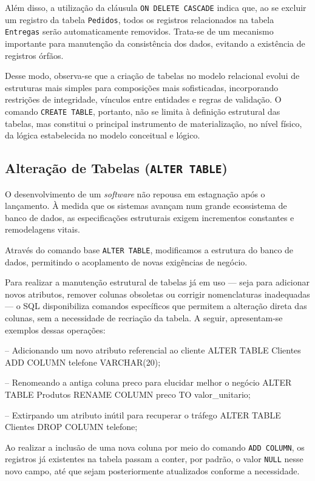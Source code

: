 Além disso, a utilização da cláusula \texttt{ON DELETE CASCADE} indica que, ao se excluir um registro da tabela \texttt{Pedidos}, todos os registros relacionados na tabela \texttt{Entregas} serão automaticamente removidos. Trata-se de um mecanismo importante para manutenção da consistência dos dados, evitando a existência de registros órfãos.

Desse modo, observa-se que a criação de tabelas no modelo relacional evolui de estruturas mais simples para composições mais sofisticadas, incorporando restrições de integridade, vínculos entre entidades e regras de validação. O comando \texttt{CREATE TABLE}, portanto, não se limita à definição estrutural das tabelas, mas constitui o principal instrumento de materialização, no nível físico, da lógica estabelecida no modelo conceitual e lógico.

\subsection{Alteração de Tabelas (\texttt{ALTER TABLE})}

O desenvolvimento de um \textit{software} não repousa em estagnação após o lançamento. À medida que os sistemas avançam num grande ecossistema de banco de dados, as especificações estruturais exigem incrementos constantes e remodelagens vitais.

Através do comando base \texttt{ALTER TABLE}, modificamos a estrutura do banco de dados, permitindo o acoplamento de novas exigências de negócio.

Para realizar a manutenção estrutural de tabelas já em uso — seja para adicionar novos atributos, remover colunas obsoletas ou corrigir nomenclaturas inadequadas — o SQL disponibiliza comandos específicos que permitem a alteração direta das colunas, sem a necessidade de recriação da tabela. A seguir, apresentam-se exemplos dessas operações:

\begin{sqlcode}
-- Adicionando um novo atributo referencial ao cliente
ALTER TABLE Clientes
ADD COLUMN telefone VARCHAR(20);

-- Renomeando a antiga coluna preco para elucidar melhor o negócio
ALTER TABLE Produtos 
RENAME COLUMN preco TO valor_unitario;

-- Extirpando um atributo inútil para recuperar o tráfego
ALTER TABLE Clientes
DROP COLUMN telefone;
\end{sqlcode}

\begin{tcolorbox}[colback=blue!5,colframe=blue!40!black,title=Nota importante: Novos dados NULOS]
Ao realizar a inclusão de uma nova coluna por meio do comando \texttt{ADD COLUMN}, os registros já existentes na tabela passam a conter, por padrão, o valor \texttt{NULL} nesse novo campo, até que sejam posteriormente atualizados conforme a necessidade.
\end{tcolorbox}

